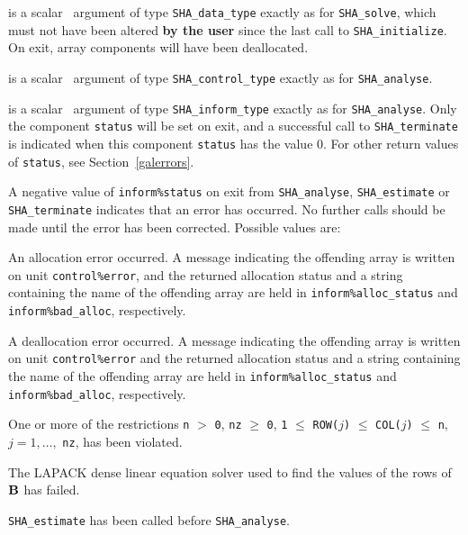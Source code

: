 \documentclass{galahad}
\newcommand{\packagename}{SHA}
\begin{document}
\vspace*{-1mm}
\begin{description}

 is a scalar \intentinout\ argument of type 
{\tt \packagename\_data\_type} 
exactly as for
{\tt \packagename\_solve},
which must not have been altered {\bf by the user} since the last call to 
{\tt \packagename\_initialize}.
On exit, array components will have been deallocated.

 is a scalar \intentin\ argument of type 
{\tt \packagename\_control\_type}
exactly as for
{\tt \packagename\_analyse}.

 is a scalar \intentout\ argument of type
{\tt \packagename\_inform\_type}
exactly as for
{\tt \packagename\_analyse}.
Only the component {\tt status} will be set on exit, and a 
successful call to 
{\tt \packagename\_terminate}
is indicated when this  component {\tt status} has the value 0. 
For other return values of {\tt status}, see Section~\ref{galerrors}.

\end{description}


\galerrors
A negative value of {\tt inform\%status} on exit from 
{\tt \packagename\_analyse},
{\tt \packagename\_estimate}
or 
{\tt \packagename\_terminate}
indicates that an error has occurred. No further calls should be made
until the error has been corrected. Possible values are:

\begin{description}

 An allocation error occurred. 
A message indicating the offending
array is written on unit {\tt control\%error}, and the returned allocation 
status and a string containing the name of the offending array
are held in {\tt inform\%alloc\_\-status}
and {\tt inform\%bad\_alloc}, respectively.

 A deallocation error occurred. 
A message indicating the offending 
array is written on unit {\tt control\%error} and the returned allocation 
status and a string containing the name of the offending array
are held in {\tt inform\%alloc\_\-status}
and {\tt inform\%bad\_alloc}, respectively.

One or more of the restrictions
{\tt n} $>$ {\tt 0},  {\tt nz} $\ge$ {\tt 0}, 
{\tt 1} $\le$ {\tt ROW(}$j${\tt )} $\le$ {\tt COL(}$j${\tt )} $\le$ {\tt n}, 
$j = 1, \ldots,$ {\tt nz},
has been violated.

The LAPACK dense linear equation solver used to find the values of
the rows of ${\mathbf{B}}$ has failed.

  {\tt \packagename\_estimate} has been called
before {\tt \packagename\_analyse}. 

\end{description}
\end{document}
